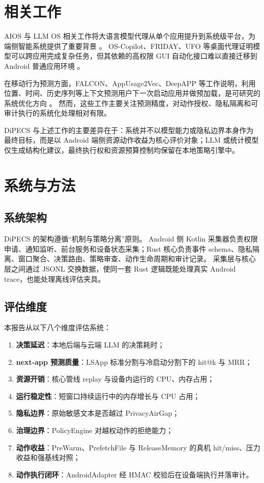 \documentclass[12pt,a4paper]{article}
\begin{document}
\section{相关工作}\label{sec:related}

AIOS 与 LLM OS 相关工作将大语言模型代理从单个应用提升到系统级平台，为端侧智能系统提供了重要背景 \cite{aios,memgpt}。
OS-Copilot、FRIDAY、UFO 等桌面代理证明模型可以跨应用完成复杂任务，但其依赖的高权限 GUI 自动化接口难以直接迁移到 Android 普通应用环境 \cite{os-copilot,os-copilot-page,ufo}。

在移动行为预测方面，FALCON、AppUsage2Vec、DeepAPP 等工作说明，利用位置、时间、历史序列等上下文预测用户下一次启动应用并做预加载，是可研究的系统优化方向 \cite{falcon,appusage2vec,deepapp}。
然而，这些工作主要关注预测精度，对动作授权、隐私隔离和可审计执行的系统化处理相对有限。

DiPECS 与上述工作的主要差异在于：系统并不以模型能力或隐私边界本身作为最终目标，而是以 Android 端侧资源动作收益为核心评价对象；LLM 或统计模型仅生成结构化建议，最终执行权和资源预算控制均保留在本地策略引擎中。

\section{系统与方法}\label{sec:method}

\subsection{系统架构}\label{subsec:architecture}

DiPECS 的架构遵循``机制与策略分离''原则。
Android 侧 Kotlin 采集器负责权限申请、通知监听、前台服务和设备状态采集；Rust 核心负责事件 schema、隐私隔离、窗口聚合、决策路由、策略审查、动作生命周期和审计记录。
采集层与核心层之间通过 JSONL 交换数据，使同一套 Rust 逻辑既能处理真实 Android trace，也能处理离线评估夹具。

\subsection{评估维度}\label{subsec:dimensions}

本报告从以下八个维度评估系统：

\begin{enumerate}[label=(\arabic*)]
  \item \textbf{决策延迟}：本地后端与云端 LLM 的决策耗时；
  \item \textbf{next-app 预测质量}：LSApp 标准分割与冷启动分割下的 hit@k 与 MRR；
  \item \textbf{资源开销}：核心管线 replay 与设备内运行的 CPU、内存占用；
  \item \textbf{运行稳定性}：短窗口持续运行中的内存增长与 CPU 占用；
  \item \textbf{隐私边界}：原始敏感文本是否越过 PrivacyAirGap；
  \item \textbf{治理边界}：PolicyEngine 对越权动作的拒绝能力；
  \item \textbf{动作收益}：PreWarm、PrefetchFile 与 ReleaseMemory 的真机 hit/miss、压力收益和强基线对照；
  \item \textbf{动作执行闭环}：AndroidAdapter 经 HMAC 校验后在设备端执行并落审计。
\end{enumerate}
\end{document}
